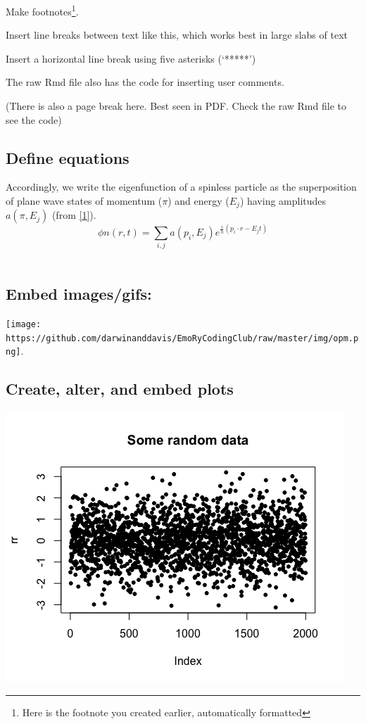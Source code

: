 \documentclass[article]{article}
\begin{document}
Make footnotes\footnote{Here is the footnote you created earlier,
  automatically formatted}.

Insert line breaks between text like this, which works best in large
slabs of text

Insert a horizontal line break using five asterisks (`*****')

The raw Rmd file also has the code for inserting user comments.

(There is also a page break here. Best seen in PDF. Check the raw Rmd
file to see the code)

\newpage

\subsection{Define equations}\label{define-equations}

Accordingly, we write the eigenfunction of a spinless particle as the
superposition of plane wave states of momentum (\(\pi\)) and energy
(\(E_{j}\)) having amplitudes \(a(\pi,E_{j})\) (from
\href{https://arxiv.org/vc/quant-ph/papers/0607/0607001v1.pdf}{{[}1{]}}).
\[
\phi n(r,t) =
  \sum_{i, j} a(p_{i},E_{j})
  e^{
    \frac{i}
    {h}
    (p_{i} \cdot r - E_{j}t)
}
\] ~

\subsection{Embed images/gifs:}\label{embed-imagesgifs}

\texttt{[image: https://github.com/darwinanddavis/EmoRyCodingClub/raw/master/img/opm.png]}.

\newpage

\subsection{Create, alter, and embed
plots}\label{create-alter-and-embed-plots}

\includegraphics{Lesson5_rmd_files/figure-docx/unnamed-chunk-2-1.png}
\end{document}
